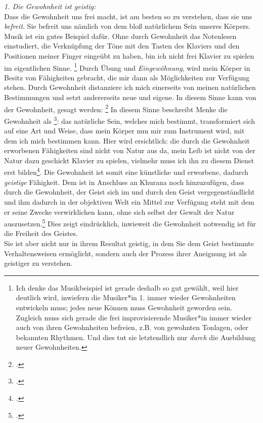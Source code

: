 \documentclass[12pt, a4paper, openany]{report}
\begin{document}
\emph{1. Die Gewohnheit ist geistig:}\\
Dass die Gewohnheit uns frei macht, ist am besten so zu verstehen, dass sie uns \emph{befreit}. 
Sie befreit uns nämlich von dem bloß natürlichem Sein unseres Körpers.
Musik ist ein gutes Beispiel dafür. 
Ohne durch Gewohnheit das Notenlesen einstudiert, die Verknüpfung der Töne mit den Tasten des Klaviers und den Positionen meiner Finger eingeübt zu haben, bin ich nicht frei Klavier zu spielen im eigentlichen Sinne.%
\footnote{
    Ich denke das Musikbeispiel ist gerade deshalb so gut gewählt, weil hier deutlich wird, inwiefern die Musiker*in 1. immer wieder Gewohnheiten entwickeln muss; jedes neue Können muss Gewohnheit geworden sein.
     Zugleich muss sich gerade die frei improvisierende Musiker*in immer wieder auch von ihren Gewohnheiten befreien, z.B. von gewohnten Tonlagen, oder bekannten Rhythmen. 
    Und dies tut sie letztendlich nur \emph{durch} die Ausbildung neuer Gewohnheiten.
}
Durch Übung und \emph{Eingewöhnung}, wird mein Körper in Besitz von Fähigkeiten gebracht, die mir dann als Möglichkeiten zur Verfügung stehen.
Durch Gewohnheit distanziere ich mich einerseits von meinen natürlichen Bestimmungen und setzt andererseits neue und eigene. 
In diesem Sinne kann von der Gewohnheit, gesagt werden: \footcite[][§410 (Anmerkung), S. 185]{hegel_enzyklopädie_1969}
In diesem Sinne beschreibt Menke die Gewohnheit als \footcite[][130]{menke_autonomie_2018}:
das natürliche Sein, welches mich bestimmt, transformiert sich auf eine Art und Weise, dass mein Körper nun mir zum Instrument wird, mit dem ich mich bestimmen kann.
Hier wird ersichtlich: die durch die Gewohnheit erworbenen Fähigkeiten sind nicht von Natur aus da, mein Leib ist nicht von der Natur dazu geschickt Klavier zu spielen, vielmehr muss ich ihn zu diesem Dienst erst bilden\footcite[Vgl.][§410 Zusatz, S. 190]{hegel_enzyklopädie_1969}. 
Die Gewohnheit ist somit eine künstliche und erworbene, dadurch \emph{geistige} Fähigkeit.
Dem ist in Anschluss an Khurana noch hinzuzufügen, dass durch die Gewohnheit, der Geist sich im und durch den Geist vergegenständlicht und ihm dadurch in der objektiven Welt ein Mittel zur Verfügung steht mit dem er seine Zwecke verwirklichen kann, ohne sich selbst der Gewalt der Natur auszusetzen.\footcite[Vgl.][426]{khurana_freiheit_2017}
Dies zeigt eindrücklich, inwieweit die Gewohnheit notwendig ist für die Freiheit des Geistes.\\
Sie ist aber nicht nur in ihrem Resultat geistig, in dem Sie dem Geist bestimmte Verhaltensweisen ermöglicht, sondern auch der Prozess ihrer Aneignung ist als geistiger zu verstehen.
\end{document}
